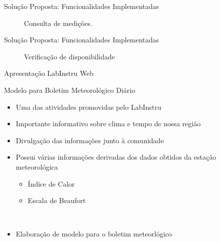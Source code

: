 \begin{frame}{Solução Proposta: Funcionalidades Implementadas}
\begin{figure}[h!]
\centering
{}
\caption{Consulta de medições.} \label{fig:uc001}
\end{figure}
\end{frame}

\begin{frame}{Solução Proposta: Funcionalidades Implementadas}
\begin{figure}[h!]
\centering
{}
\caption{Verificação de disponibilidade} \label{fig:disponibilidade}
\end{figure}
\end{frame}

\begin{frame}{Apresentação LabInstru Web}
	\begin{center}
	\end{center}
\end{frame}

\begin{frame}{Modelo para Boletim Meteorológico Diário}
\begin{itemize}
	\item Uma das atividades promovidas pelo LabInstru
	\item Importante informativo sobre clima e tempo de nossa região
\item Divulgação das informações junto à comunidade
	\ \ \newline
	\item Possui várias informações derivadas dos dados obtidos da estação meteorológica
	\begin{itemize}
		\item Índice de Calor
		\item Escala de Beaufort
	\end{itemize}
	\ \ \newline

	\item Elaboração de modelo para o boletim meteorlógico
\end{itemize}
\end{frame}

